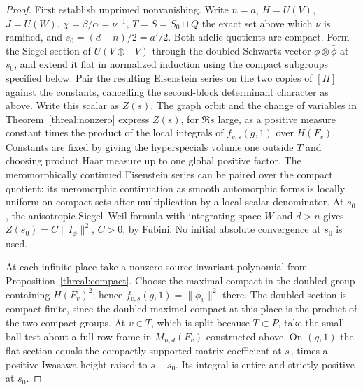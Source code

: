 \begin{proof}
First establish unprimed nonvanishing. Write \(n=a\),
\(H=U(V)\), \(J=U(W)\), \(\chi=\beta/\alpha=\nu^{-1}\),
\(T=S=S_0\sqcup Q\) the exact set above which \(\nu\) is ramified,
and \(s_0=(d-n)/2=a'/2\). Both adelic quotients are compact.
Form the Siegel section of \(U(V\oplus -V)\) through the
doubled Schwartz vector \(\phi\otimes\bar\phi\) at \(s_0\),
and extend it flat in normalized induction using the compact
subgroups specified below. Pair the resulting Eisenstein series
on the two copies of \([H]\) against the constants, cancelling the
second-block determinant character as above. Write this scalar
as \(Z(s)\). The graph orbit and the change of variables in
Theorem~\ref{threal:nonzero} express \(Z(s)\), for \(\Re s\)
large, as a positive measure constant times the product of the
local integrals of \(f_{v,s}(g,1)\) over \(H(F_v)\). Constants
are fixed by giving the hyperspecials volume one outside \(T\)
and choosing product Haar measure up to one global positive
factor. The meromorphically continued Eisenstein series can be
paired over the compact quotient: its meromorphic continuation
as smooth automorphic forms is locally uniform on compact sets
after multiplication by a local scalar denominator. At \(s_0\),
the anisotropic Siegel--Weil formula with integrating space \(W\)
and \(d>n\) gives \(Z(s_0)=C\|I_\phi\|^2\), \(C>0\), by Fubini.
No initial absolute convergence at \(s_0\) is used.
\cite[Theorem~7.1 and \S11.3]{ganQiuTakeda}

At each infinite place take a nonzero source-invariant polynomial
from Proposition~\ref{threal:compact}. Choose the maximal compact
in the doubled group containing \(H(F_v)^2\); hence
\(f_{v,s}(g,1)=\|\phi_v\|^2\) there. The doubled section is
compact-finite, since the doubled maximal compact at this place
is the product of the two compact groups. At \(v\in T\), which is
split because \(T\subset P\), take the small-ball test about a
full row frame in \(M_{n,d}(F_v)\) constructed above. On
\((g,1)\) the flat section equals the compactly supported matrix
coefficient at \(s_0\) times a positive Iwasawa height raised to
\(s-s_0\). Its integral is entire and strictly positive at \(s_0\).


\end{proof}
